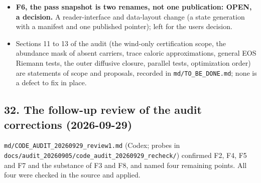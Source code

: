 \documentclass[english,a4paper]{my_memo}
\begin{document}
\begin{itemize}
  from the code\textquotesingle s own H2 caloric at 1000 K): \textbar div q\textbar{} is 1 to 3 per cent of
  the heating over the molecular layer (median 1.8 per cent over
  1.001 \textless{} r \textless{} 1.03), 8 to 11 per cent at the base cell, and as large as the
  net heating or larger where heating and cooling cancel; the integral of
  \textbar div q\textbar{} is 1.4 to 1.5 per cent of the integrated heating, while the SIGNED
  integral vanishes (-1e-18 of it), as the closed diffusive boundary of the
  carrier operator requires (script, inputs with their md5 and the numbers:
  \texttt{docs/audit\_20260905/code\_audit\_20260929\_F1/}).
  It can move the temperature of the H2 layer; the implementation (the
  carrier face fluxes into the energy rows of the steady residual and the
  marching update, the compensating atomic flux from the element
  constraints, tests) is the next item.
\item
  \textbf{F6, the pass snapshot is two renames, not one publication: OPEN, a
  decision.} A reader-interface and data-layout change (a state generation
  with a manifest and one published pointer); left for the user\textquotesingle s decision.
\item
  Sections 11 to 13 of the audit (the wind-only certification scope, the
  abundance mask of absent carriers, trace caloric approximations, general
  EOS Riemann tests, the outer diffusive closure, parallel tests,
  optimization order) are statements of scope and proposals, recorded in
  \texttt{md/TO\_BE\_DONE.md}; none is a defect to fix in place.
\end{itemize}

\subsection{32. The follow-up review of the audit corrections (2026-09-29)}\label{32-the-follow-up-review-of-the-audit-corrections-2026-09-29}

\texttt{md/CODE\_AUDIT\_20260929\_review1.md} (Codex; probes in
\texttt{docs/audit\_20260905/code\_audit\_20260929\_recheck/}) confirmed F2, F4, F5 and
F7 and the substance of F3 and F8, and named four remaining points. All four
were checked in the source and applied.
\end{document}
